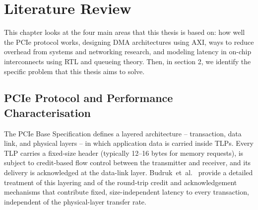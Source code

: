 
\chapter{Literature Review}

\label{Chapter2}


This chapter looks at the four main areas that this thesis is based on: how well the PCIe protocol works, designing DMA architectures using AXI, ways to reduce overhead from systems and networking research, and modeling latency in on-chip interconnects using RTL and queueing theory. Then, in section 2, we identify the specific problem that this thesis aims to solve.


\section{PCIe Protocol and Performance Characterisation}
\label{sec:ch2_pcie}

The \ac{PCIe} Base Specification \cite{pcisig2017base} defines a layered architecture -- transaction, data link, and physical layers -- in which application data is carried inside \acp{TLP}. Every \ac{TLP} carries a fixed-size header (typically 12--16 bytes for memory requests), is subject to credit-based flow control between the transmitter and receiver, and its delivery is acknowledged at the data-link layer. Budruk~et~al.~\cite{budruk2004pcie} provide a detailed treatment of this layering and of the round-trip credit and acknowledgement mechanisms that contribute fixed, size-independent latency to every transaction, independent of the physical-layer transfer rate.

